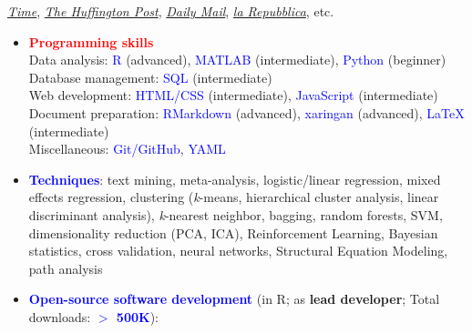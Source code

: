 \documentclass[10pt]{article}
\begin{document}
	\href{http://time.com/3242/driving-over-your-best-friend-its-the-right-thing-to-do/}{\textit{Time}}, \href{http://www.huffingtonpost.com/entry/autism-empathy-brain-research_us_56f92575e4b014d3fe237413}{\textit{The Huffington Post}}, \href{http://www.dailymail.co.uk/sciencetech/article-4308284/Virtual-reality-experiment-puts-altruism-test.html}{\textit{Daily Mail}}, \href{http://www.repubblica.it/scienze/2017/04/11/news/area_cervello_perdono-162669836/?rss}{\textit{la Repubblica}}, etc.
	
	
	\begin{itemize}
	\item \textcolor{red}{\textbf{Programming skills}}\\
	 Data analysis: \textcolor{blue}{R} (advanced), \textcolor{blue}{MATLAB} (intermediate), \textcolor{blue}{Python} (beginner)\\
	 
	 Database management: \textcolor{blue}{SQL} (intermediate)\\
	 
	 Web development: \textcolor{blue}{HTML/CSS} (intermediate), \textcolor{blue}{JavaScript} (intermediate)\\
		Document preparation: \textcolor{blue}{RMarkdown} (advanced), \textcolor{blue}{xaringan} (advanced), \textcolor{blue}{\LaTeX{}} (intermediate)\\
		
	 Miscellaneous: \textcolor{blue}{Git/GitHub}, \textcolor{blue}{YAML} 
	

	\item \textcolor{blue}{\textbf{Techniques}}: text mining, meta-analysis, logistic/linear regression, mixed effects regression, clustering (\textit{k}-means, hierarchical cluster analysis, linear discriminant analysis), \textit{k}-nearest neighbor, bagging, random forests, SVM, dimensionality reduction (PCA, ICA), Reinforcement Learning, Bayesian statistics, cross validation, neural networks, Structural Equation Modeling, path analysis
	
	
	\item \textcolor{blue}{\textbf{Open-source software development}} (in R; as \textbf{lead developer}; Total downloads: \textcolor{blue}{\textbf{$>$ 500K}}):
	 \vspace*{-0.09in}
	 
	\begin{itemize}
	

\end{itemize}
\end{itemize}
\end{document}
